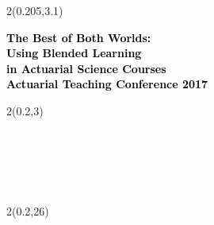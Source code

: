 \begin{frame}[plain]
  \begin{textblock*}{2\TPHorizModule}(0.205\TPHorizModule,3.1\TPVertModule)
    \raggedright%
    \bfseries
    \fontsize{20}{20}\selectfont
    \textcolor{black}{%
      The Best of Both Worlds: \\
      Using Blended Learning \\
      in Actuarial Science Courses} \\
    \mdseries
    \fontsize{14}{18}\selectfont
    \textcolor{black}{Actuarial Teaching Conference 2017}
  \end{textblock*}
  \begin{textblock*}{2\TPHorizModule}(0.2\TPHorizModule,3\TPVertModule)
    \raggedright%
    \bfseries
    \fontsize{20}{20}\selectfont
    \textcolor{white}{%
      The Best of Both Worlds: \\
      Using Blended Learning \\
      in Actuarial Science Courses} \\
    \mdseries
    \fontsize{14}{18}\selectfont
    \textcolor{white}{Actuarial Teaching Conference 2017}
  \end{textblock*}

  \begin{textblock*}{2\TPHorizModule}(0.2\TPHorizModule,26\TPVertModule)
    \fontsize{10}{12}\selectfont
    \textcolor{white}{June 27, 2017}
  \end{textblock*}
\end{frame}
\endgroup

